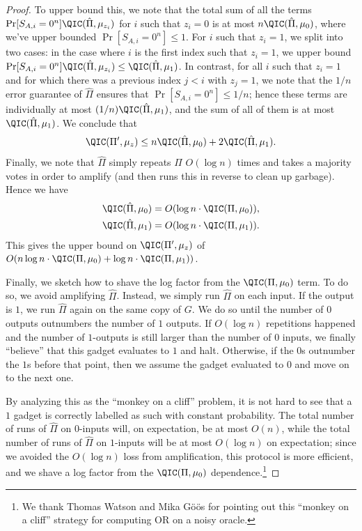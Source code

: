 \begin{proof}
To upper bound this, we note that the total sum of
all the terms $\Pr[S_{A,i}=0^n]\QIC(\hat{\Pi},\mu_{z_i})$ for
$i$ such that $z_i=0$ is at most $n\QIC(\hat{\Pi},\mu_0)$,
where we've upper bounded $\Pr[S_{A,i}=0^n]\le 1$.
For $i$ such that $z_i=1$, we split into two cases:
in the case where $i$ is the first index such that $z_i=1$,
we upper bound
$\Pr[S_{A,i}=0^n]\QIC(\hat{\Pi},\mu_{z_i})\le \QIC(\hat{\Pi},\mu_1)$.
In contrast, for all $i$ such that $z_i=1$ and for which
there was a previous index $j<i$ with $z_j=1$, we note that
the $1/n$ error guarantee of $\hat{\Pi}$ ensures that
$\Pr[S_{A,i}=0^n]\le 1/n$; hence these terms are individually
at most $(1/n)\QIC(\hat{\Pi},\mu_1)$, and the sum of all of them
is at most $\QIC(\hat{\Pi},\mu_1)$. We conclude that
\[\QIC(\Pi',\mu_z)\le n\QIC(\hat{\Pi},\mu_0)+2\QIC(\hat{\Pi},\mu_1).\]
Finally, we note that $\hat{\Pi}$ simply repeats $\Pi$
$O(\log n)$ times and takes a majority votes in order to amplify
(and then runs this in reverse to clean up garbage). Hence
we have
\begin{align*}
\QIC(\hat{\Pi},\mu_0)&=O(\log n\cdot \QIC(\Pi,\mu_0)),\\
\QIC(\hat{\Pi},\mu_1)&=O(\log n\cdot \QIC(\Pi,\mu_1)).
\end{align*}
This gives the upper bound on $\QIC(\Pi',\mu_z)$ of
$O(n\log n\cdot \QIC(\Pi,\mu_0)+\log n\cdot \QIC(\Pi,\mu_1))$.

Finally, we sketch how to shave the log factor from the $\QIC(\Pi,\mu_0)$
term. To do so, we avoid amplifying $\hat{\Pi}$. Instead,
we simply run $\hat{\Pi}$ on each input. If the output is $1$,
we run $\hat{\Pi}$ again on the same copy of $G$. We do so until
the number of $0$ outputs outnumbers the number of $1$ outputs.
If $O(\log n)$ repetitions happened and the number of $1$-outputs
is still larger than the number of $0$ inputs, we finally
``believe'' that this gadget evaluates to $1$ and halt.
Otherwise, if the $0$s outnumber the $1$s before that point,
then we assume the gadget evaluated to $0$ and move on to the
next one.

By analyzing this as the ``monkey on a cliff'' problem,
it is not hard to see that a $1$ gadget is correctly
labelled as such with constant probability.
The total number of runs of $\hat{\Pi}$ on $0$-inputs
will, on expectation, be at most $O(n)$, while the total
number of runs of $\hat{\Pi}$ on $1$-inputs will be
at most $O(\log n)$ on expectation; since we avoided
the $O(\log n)$ loss from amplification, this protocol
is more efficient, and we shave a log factor from the
$\QIC(\Pi,\mu_0)$ dependence.\footnote{We thank
Thomas Watson and Mika G{\"o}{\"o}s for pointing out
this ``monkey on a cliff'' strategy for computing OR on a noisy oracle.}
\end{proof}

